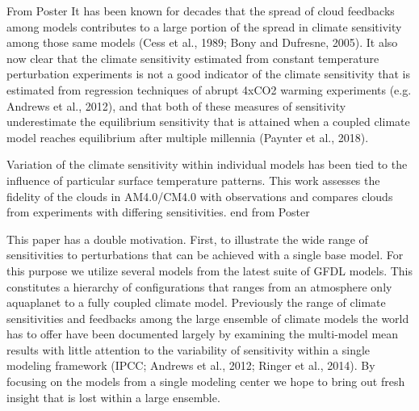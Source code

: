 \documentclass[11pt]{article}   	%
\begin{document}
 

From Poster
It has been known for decades that  the spread of cloud feedbacks among models contributes to a large portion of the spread in climate sensitivity among those same models (Cess et al., 1989; Bony and Dufresne, 2005).  It also now clear that the climate sensitivity estimated from constant temperature perturbation experiments is not a good indicator of the climate sensitivity that is estimated from regression techniques of abrupt 4xCO2 warming experiments (e.g. Andrews et al., 2012), and that both of these measures of sensitivity underestimate the equilibrium sensitivity that is attained when a coupled climate model reaches equilibrium after multiple millennia (Paynter et al., 2018).      

Variation of the climate sensitivity within individual models has been tied to the influence of particular surface temperature patterns.  This work assesses the fidelity of the clouds in AM4.0/CM4.0 with observations and compares clouds from experiments with differing sensitivities. 
end from Poster

This paper has a double motivation.  First, to illustrate the wide range of sensitivities to perturbations 
that can be achieved with a single base model.  For this purpose we utilize several models from the latest suite of GFDL 
models.  This constitutes a hierarchy of configurations that ranges from an atmosphere only aquaplanet to a fully coupled 
climate model.  Previously the range of climate sensitivities and feedbacks among the large ensemble of climate models 
the world has to offer have been documented largely by examining the multi-model mean results with little attention to 
the variability of sensitivity within a single modeling framework (IPCC; Andrews et al., 2012; Ringer et al., 2014).  By 
focusing on the models from a single modeling center we hope to bring out fresh insight that is lost within a large ensemble.
\end{document}
